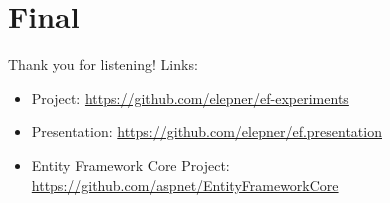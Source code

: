 \documentclass{bredelebeamer}
\begin{document}
\section*{Final}
\begin{frame}{Thank you for listening!}
    Links:
    \begin{itemize}
        \item{
            Project: \href{https://github.com/elepner/ef-experiments}{https://github.com/elepner/ef-experiments}
        }
        \item{
            Presentation: \href{https://github.com/elepner/ef.presentation}{https://github.com/elepner/ef.presentation}
        }
        \item{
            Entity Framework Core Project: \href{https://github.com/aspnet/EntityFrameworkCore}{https://github.com/aspnet/EntityFrameworkCore}
        }
    \end{itemize}
\end{frame}
\end{document}
